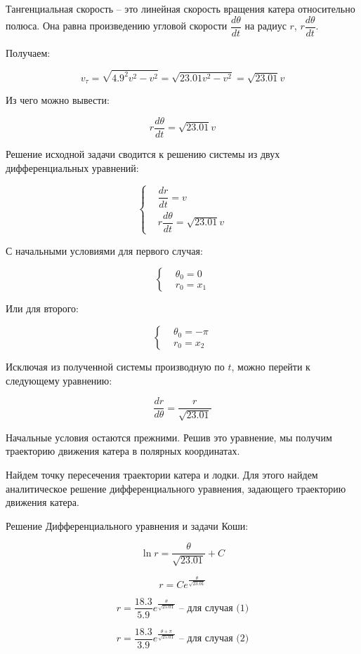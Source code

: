 \documentclass[
  12pt,
  a4paper,
  DIV=11,
  numbers=noendperiod]{scrreprt}
\begin{document}
Тангенциальная скорость -- это линейная скорость вращения катера
относительно полюса. Она равна произведению угловой скорости
\(\dfrac{d \theta}{dt}\) на радиус \(r\), \(r \dfrac{d \theta}{dt}\).

Получаем:

\[v_{\tau} = \sqrt{4.9^2v^2-v^2} = \sqrt{23.01v^2-v^2} = \sqrt{23.01}v\]

Из чего можно вывести:

\[
r\dfrac{d \theta}{dt} = \sqrt{23.01}v
\]

Решение исходной задачи сводится к решению системы из двух
дифференциальных уравнений:

\[\begin{cases}
&\dfrac{dr}{dt} = v\\
&r\dfrac{d \theta}{dt} = \sqrt{23.01}v
\end{cases}\]

С начальными условиями для первого случая:

\[\begin{cases}
&{\theta}_0 = 0\\  \tag{1}
&r_0 = x_1
\end{cases}\]

Или для второго:

\[\begin{cases}
&{\theta}_0 = -\pi\\  \tag{2}
&r_0 = x_2
\end{cases}\]

Исключая из полученной системы производную по \(t\), можно перейти к
следующему уравнению:

\[
\dfrac{dr}{d \theta} = \dfrac{r}{\sqrt{23.01}}
\]

Начальные условия остаются прежними. Решив это уравнение, мы получим
траекторию движения катера в полярных координатах.

Найдем точку пересечения траектории катера и лодки. Для этого найдем
аналитическое решение дифференциального уравнения, задающего траекторию
движения катера.

Решение Дифференциального уравнения и задачи Коши:

\[
\ln{r}=\frac{\theta}{\sqrt{23.01}} + C
\]

\[
r = Ce^\frac{\theta}{\sqrt{23.01}}
\]

\[
r = \frac{18.3}{5.9} e^\frac{\theta}{\sqrt{25.01}} \text{ -- для случая (1)}
\]

\[
r = \frac{18.3}{3.9} e^\frac{\theta+\pi}{\sqrt{25.01}}  \text{ -- для случая (2)}
\]
\end{document}
